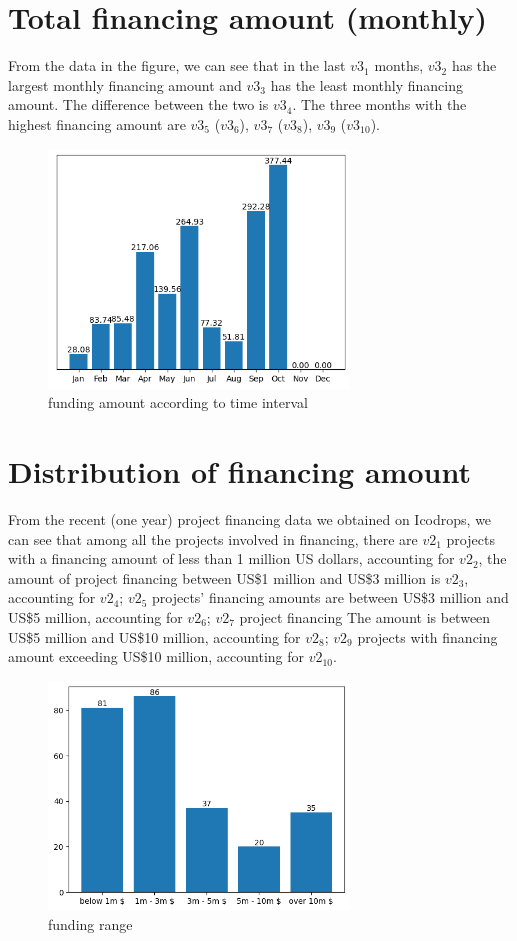 \documentclass{TTP}
\begin{document}
\section{Total financing amount (monthly)}
From the data in the figure, we can see that in the last $v3_1$ months, $v3_2$ has the largest monthly financing amount and $v3_3$ has the least monthly financing amount. The difference between the two is $v3_4$. The three months with the highest financing amount are $v3_5$ ($v3_6$), $v3_7$ ($v3_8$), $v3_9$ ($v3_10$).
\begin{figure}[h]
  \centering
  \includegraphics[width=8cm]{time_funding}
  \caption{funding amount according to time interval}
\end{figure}

\section{Distribution of financing amount}
From the recent (one year) project financing data we obtained on Icodrops, we can see that among all the projects involved in financing, there are $v2_1$ projects with a financing amount of less than 1 million US dollars, accounting for $v2_2$, the amount of project financing between US\$1 million and US\$3 million is $v2_3$, accounting for $v2_4$; $v2_5$ projects' financing amounts are between US\$3 million and US\$5 million, accounting for $v2_6$; $v2_7$ project financing The amount is between US\$5 million and US\$10 million, accounting for $v2_8$; $v2_9$ projects with financing amount exceeding US\$10 million, accounting for $v2_10$.
\begin{figure}[h]
  \centering
  \includegraphics[width=8cm]{funding_range}
  \caption{funding range}
\end{figure}
\end{document}
